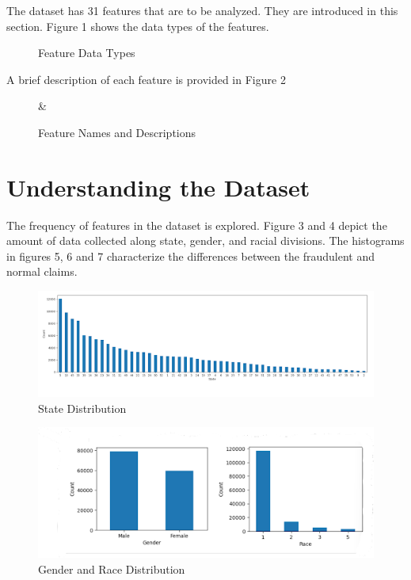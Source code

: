\documentclass[twoside,11pt]{article}
\begin{document}
The dataset has 31 features that are to be analyzed. They are introduced in this section.
Figure 1 shows the data types of the features.
\begin{figure}[h]
    \center
    \label{fig:dtypes}
    \caption{Feature Data Types}
\end{figure}
\newpage
A brief description of each feature is provided in Figure 2

\begin{figure}[h]
  \center
        {\Feature & \Description}
  \label{fig:descr}
  \caption{Feature Names and Descriptions}
\end{figure}


\newpage
\section{Understanding the Dataset}

The frequency of features in the dataset is explored. Figure 3 and 4 depict
the amount of data collected along state, gender, and racial divisions. The histograms
in figures 5, 6 and 7
 characterize the differences between the fraudulent and normal claims.
\begin{figure}[h]
  \centering
  \includegraphics[width=\textwidth]{./img/sdist.png}
  \caption{State Distribution}
  \label{fig:grdist}
\end{figure}

\begin{figure}[h]
  \centering
  \includegraphics[width=\textwidth]{./img/grdist.png}
  \caption{Gender and Race Distribution}
  \label{fig:sdist}
\end{figure}
\end{document}
